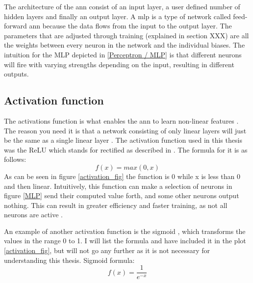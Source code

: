         The architecture of the \gls{ann} consist of an input layer, a user defined number of hidden layers and finally an output layer. A \gls{mlp} is a type of network called feed-forward \gls{ann} because the data flows from the input to the output layer. The parameters that are adjusted through training (explained in section XXX) are all the weights between every neuron in the network and the individual biases. The intuition for the MLP depicted in \ref{Perceptron / MLP} is that different neurons will fire with varying strengths depending on the input, resulting in different outputs.
        
    \subsection{Activation function} \label{activation function}
        The activations function is what enables the \gls{ann} to learn non-linear features \cite{razavi2021deep_exp_per}. The reason you need it is that a network consisting of only linear layers will just be the same as a single linear layer \cite{razavi2021deep_exp_per}. The activation function used in this thesis was the ReLU which stands for rectified as described in \cite{sharma2019new_activation_func}. The formula for it is as follows:
            \begin{equation} \label{relu_eq}
                f(x) = max(0,x)
            \end{equation}
        As can be seen in figure \ref{activation_fig} the function is 0 while x is less than 0 and then linear. Intuitively, this function can make a selection of neurons in figure \ref{MLP} send their computed value forth, and some  other neurons output nothing. This can result in greater efficiency and faster training, as not all neurons are active \cite{sharma2019new_activation_func}.
        
        An example of another activation function is the sigmoid \cite{sharma2019new_activation_func}, which transforms the values in the range 0 to 1. I will list the formula and have included it in the plot \ref{activation_fig}, but will not go any further as it is not necessary for understanding this thesis. Sigmoid formula:
            \begin{equation} \label{sigmoid_eq}
                f(x) = \dfrac{1}{e^{-x}} 
            \end{equation}
            
